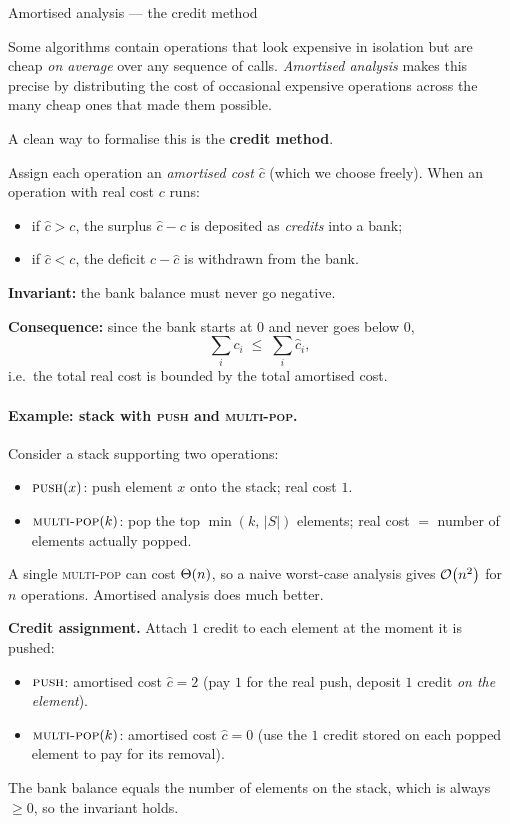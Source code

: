 \begin{intermezzo}{Amortised analysis — the credit method}

Some algorithms contain operations that look expensive in isolation but are cheap
\emph{on average} over any sequence of calls.
\emph{Amortised analysis} makes this precise by distributing the cost of occasional
expensive operations across the many cheap ones that made them possible.

A clean way to formalise this is the \textbf{credit method}.

\begin{definition}
  Assign each operation an \emph{amortised cost} $\hat{c}$ (which we choose freely).
  When an operation with real cost $c$ runs:
  \begin{itemize}[nosep]
    \item if $\hat{c} > c$, the surplus $\hat{c} - c$ is deposited as \emph{credits} into a bank;
    \item if $\hat{c} < c$, the deficit $c - \hat{c}$ is withdrawn from the bank.
  \end{itemize}
  \textbf{Invariant:} the bank balance must never go negative.

  \medskip
  \textbf{Consequence:} since the bank starts at $0$ and never goes below $0$,
  \[
    \sum_{i} c_i \;\leq\; \sum_{i} \hat{c}_i,
  \]
  i.e.\ the total real cost is bounded by the total amortised cost.
\end{definition}

\paragraph{Example: stack with \textsc{push} and \textsc{multi-pop}.}
Consider a stack supporting two operations:
\begin{itemize}[nosep]
  \item $\textsc{push}(x)$: push element $x$ onto the stack; real cost $1$.
  \item $\textsc{multi-pop}(k)$: pop the top $\min(k,\,|S|)$ elements; real cost $=$ number of elements actually popped.
\end{itemize}
A single \textsc{multi-pop} can cost $\Theta\!\left(n\right)$, so a naive worst-case analysis gives
$\mathcal{O}\!\left(n^2\right)$ for $n$ operations.  Amortised analysis does much better.

\medskip
\textbf{Credit assignment.}
Attach $1$ credit to each element at the moment it is pushed:
\begin{itemize}[nosep]
  \item $\textsc{push}$: amortised cost $\hat{c} = 2$
        (pay $1$ for the real push, deposit $1$ credit \emph{on the element}).
  \item $\textsc{multi-pop}(k)$: amortised cost $\hat{c} = 0$
        (use the $1$ credit stored on each popped element to pay for its removal).
\end{itemize}
The bank balance equals the number of elements on the stack, which is always $\geq 0$,
so the invariant holds.


\end{intermezzo}
